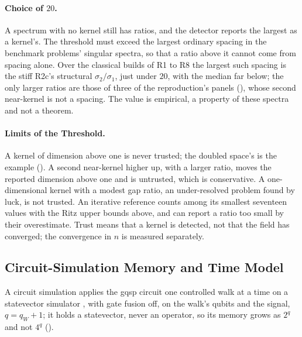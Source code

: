 \paragraph{Choice of $20$.} A spectrum with no kernel still has ratios, and the detector reports the largest as a kernel's. The threshold must exceed the largest ordinary spacing in the benchmark problems' singular spectra, so that a ratio above it cannot come from spacing alone. Over the classical builds of R1 to R8 the largest such spacing is the stiff R2c's structural $\sigma_2/\sigma_1$, just under $20$, with the median far below; the only larger ratios are those of three of the reproduction's panels (), whose second near-kernel is not a spacing. The value is empirical, a property of these spectra and not a theorem.

\paragraph{Limits of the Threshold.} A kernel of dimension above one is never trusted; the doubled space's is the example (). A second near-kernel higher up, with a larger ratio, moves the reported dimension above one and is untrusted, which is conservative. A one-dimensional kernel with a modest gap ratio, an under-resolved problem found by luck, is not trusted. An iterative reference counts among its smallest seventeen values with the Ritz upper bounds above, and can report a ratio too small by their overestimate. Trust means that a kernel is detected, not that the field has converged; the convergence in $n$ is measured separately.

\subsection{Circuit-Simulation Memory and Time Model}
\label{app:t1-model}

A circuit simulation applies the \gls{gqsp} circuit one controlled walk at a time on a statevector simulator \cite{qiskit2024}, with gate fusion off, on the walk's qubits and the signal, $q=q_W+1$; it holds a statevector, never an operator, so its memory grows as $2^q$ and not $4^q$ ().

